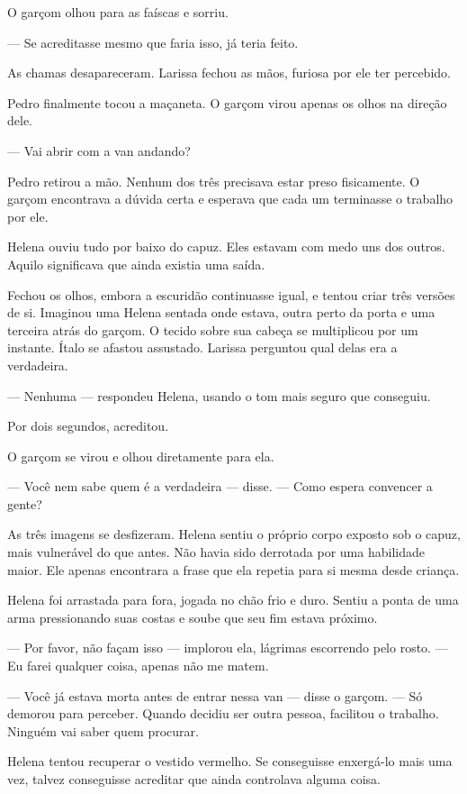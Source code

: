 O garçom olhou para as faíscas e sorriu.

— Se acreditasse mesmo que faria isso, já teria feito.

As chamas desapareceram. Larissa fechou as mãos, furiosa por ele ter percebido.

Pedro finalmente tocou a maçaneta. O garçom virou apenas os olhos na direção dele.

— Vai abrir com a van andando?

Pedro retirou a mão. Nenhum dos três precisava estar preso fisicamente. O garçom encontrava a dúvida certa e esperava que cada um terminasse o trabalho por ele.

Helena ouviu tudo por baixo do capuz. Eles estavam com medo uns dos outros. Aquilo significava que ainda existia uma saída.

Fechou os olhos, embora a escuridão continuasse igual, e tentou criar três versões de si. Imaginou uma Helena sentada onde estava, outra perto da porta e uma terceira atrás do garçom. O tecido sobre sua cabeça se multiplicou por um instante. Ítalo se afastou assustado. Larissa perguntou qual delas era a verdadeira.

— Nenhuma — respondeu Helena, usando o tom mais seguro que conseguiu.

Por dois segundos, acreditou.

O garçom se virou e olhou diretamente para ela.

— Você nem sabe quem é a verdadeira — disse. — Como espera convencer a gente?

As três imagens se desfizeram. Helena sentiu o próprio corpo exposto sob o capuz, mais vulnerável do que antes. Não havia sido derrotada por uma habilidade maior. Ele apenas encontrara a frase que ela repetia para si mesma desde criança.

Helena foi arrastada para fora, jogada no chão frio e duro. Sentiu a ponta de uma arma pressionando suas costas e soube que seu fim estava próximo.

— Por favor, não façam isso — implorou ela, lágrimas escorrendo pelo rosto. — Eu farei qualquer coisa, apenas não me matem.

— Você já estava morta antes de entrar nessa van — disse o garçom. — Só demorou para perceber. Quando decidiu ser outra pessoa, facilitou o trabalho. Ninguém vai saber quem procurar.

Helena tentou recuperar o vestido vermelho. Se conseguisse enxergá-lo mais uma vez, talvez conseguisse acreditar que ainda controlava alguma coisa.

